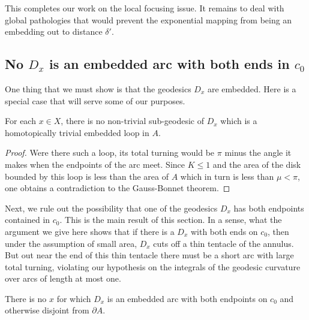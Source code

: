 This completes our work on the local focusing issue. It remains to
deal with global pathologies that would prevent the exponential
mapping from being an embedding out to distance $\delta'$.

\subsection{No $D_x$ is an embedded arc with both ends in $c_0$}

One thing that we must show  is that the geodesics $D_x$ are
embedded. Here is a special case that will serve some of our
purposes.


\begin{lemma}
\label{lem:geodesic-no-trivial-embedded-loop}
\label{noloops}
For each $x\in X$, there is no non-trivial sub-geodesic of $D_x$
which is a homotopically trivial embedded loop in $A$.
\end{lemma}


\begin{proof}
Were there such a loop, its  total turning would be $\pi$ minus the
angle it makes when the endpoints of the arc meet. Since $K\le 1$
and the area of the disk bounded by this loop is less than the area
of $A$ which in turn is less than $\mu<\pi$,  one obtains a
contradiction to the Gauss-Bonnet theorem.
\end{proof}

Next, we rule out the possibility that  one of the geodesics $D_x$
has both endpoints contained in $c_0$. This is the main result of
this section. In a sense, what the argument we give here shows that
if there is a $D_x$ with both ends on $c_0$, then under the
assumption of small area, $D_x$ cuts off a thin tentacle of the
annulus. But out near the end of this thin tentacle there must be a
short arc with large total turning, violating our hypothesis on the
integrals of the geodesic curvature over arcs of length at most one.


\begin{lemma}
\label{lem:no-geodesic-spans-c0-to-c0}
\label{Dxacross}
There is no $x$ for which $D_x$ is an embedded arc  with both
endpoints on $c_0$ and otherwise disjoint from $\partial A$.
\end{lemma}

